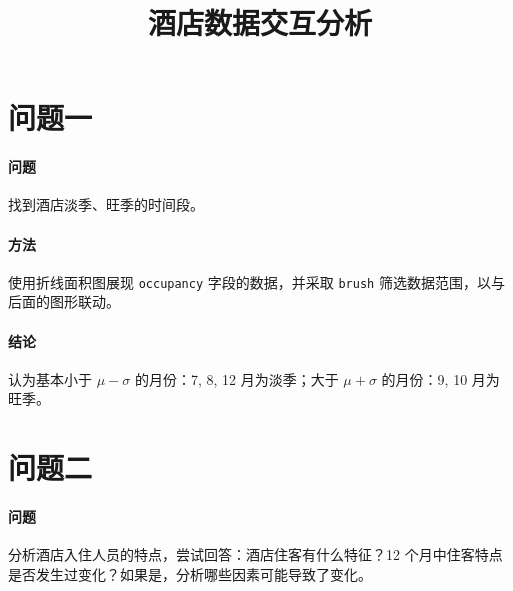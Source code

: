 \endofdump
\geometry{
    right=0.45\paperwidth,
    marginparwidth=0.4\paperwidth
}

    \title{酒店数据交互分析}
    \maketitle


    \section{问题一}

    \paragraph{问题} 找到酒店淡季、旺季的时间段。

    \paragraph{方法} 使用折线面积图展现 \verb"occupancy" 字段的数据，并采取 \verb"brush" 筛选数据范围，以与后面的图形联动。

    \paragraph{结论} 认为基本小于 $\mu-\sigma$ 的月份：7, 8, 12 月为淡季；大于 $\mu+\sigma$ 的月份：9, 10 月为旺季。


    \section{问题二}

    \paragraph{问题} 分析酒店入住人员的特点，尝试回答：酒店住客有什么特征？12 个月中住客特点是否发生过变化？如果是，分析哪些因素可能导致了变化。

